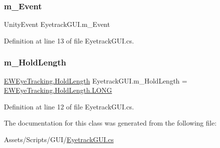 \subsubsection{\texorpdfstring{m\+\_\+\+Event}{m\_Event}}
{\footnotesize\ttfamily Unity\+Event Eyetrack\+G\+U\+I.\+m\+\_\+\+Event}



Definition at line 13 of file Eyetrack\+G\+U\+I.\+cs.

\mbox{\label{class_eyetrack_g_u_i_ab57dc65298441cee8f0018570e14addb}} 
\subsubsection{\texorpdfstring{m\+\_\+\+Hold\+Length}{m\_HoldLength}}
{\footnotesize\ttfamily \mbox{\hyperlink{class_e_w_eye_tracking_a47461bd1b91c6aacca31b57253249392}{E\+W\+Eye\+Tracking.\+Hold\+Length}} Eyetrack\+G\+U\+I.\+m\+\_\+\+Hold\+Length = \mbox{\hyperlink{class_e_w_eye_tracking_a47461bd1b91c6aacca31b57253249392ac1fabfea54ec6011e694f211f3ffebf3}{E\+W\+Eye\+Tracking.\+Hold\+Length.\+L\+O\+NG}}}



Definition at line 12 of file Eyetrack\+G\+U\+I.\+cs.



The documentation for this class was generated from the following file\+:\begin{DoxyCompactItemize}
\item 
Assets/\+Scripts/\+G\+U\+I/\mbox{\hyperlink{_eyetrack_g_u_i_8cs}{Eyetrack\+G\+U\+I.\+cs}}\end{DoxyCompactItemize}
